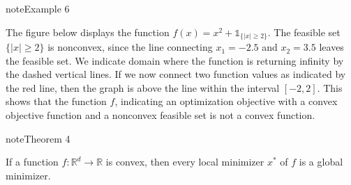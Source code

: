 \documentclass[letterpaper,10pt,english]{jupyterBook}
\begin{document}
\begin{sphinxadmonition}{note}{Example 6}



\sphinxAtStartPar
The figure below displays the function \(f(x)=x^2 + \mathbb{1}_{\{\lvert x\rvert\geq 2\}}\). The feasible set \(\{\lvert x\rvert\geq 2\}\) is nonconvex, since the line connecting \(x_1=-2.5\) and \(x_2=3.5\) leaves the feasible set. We indicate domain where the function is returning infinity by the dashed vertical lines. If we now connect two function values as indicated by the red line, then the graph is above the line within the interval \([-2,2]\). This shows that the function \(f\), indicating an optimization objective with a convex objective function and a nonconvex feasible set is not a convex function.
\begin{center}\end{center}\end{sphinxadmonition}
\label{optimization_convex:thm_convex}
\begin{sphinxadmonition}{note}{Theorem 4}



\sphinxAtStartPar
If a function \(f:\mathbb{R}^d\rightarrow\mathbb{R}\) is convex, then every local minimizer \(x^*\) of \(f\) is a global minimizer.
\end{sphinxadmonition}
\end{document}
